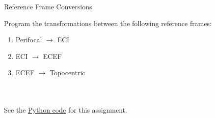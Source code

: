 


%
%

\newcommand{\hmwkTitle}{HW02}
\newcommand{\hmwkSubTitle}{Reference Frames and Ground Tracks}
\newcommand{\hmwkDueDate}{October 11th. 2025}
\newcommand{\hmwkDueTime}{11:59 PM}
\newcommand{\hmwkClass}{ENAE 441 - 0101}
\newcommand{\hmwkClassTime}{09:30 AM}
\newcommand{\hmwkClassInstructor}{Dr. Martin}
\newcommand{\hmwkAuthorName}{\textbf{Vai Srivastava}}
\newcommand{\hmwkCompletionDate}{\today}



\maketitle

\pagebreak

\begin{hwkProblem}{1}{Reference Frame Conversions} \label{hwk:p01}

	Program the transformations between the following reference frames:
	\begin{enumerate}[label=(\alph*)]
		\item \label{hwk:p01a} Perifocal \( \to \) ECI
		\item \label{hwk:p01b} ECI \( \to \) ECEF
		\item \label{hwk:p01c} ECEF \( \to \) Topocentric
	\end{enumerate}

	\hwkSol{} \label{hwk:s01}

	\hwkPart{} \label{hwk:s01a}

	\inputminted{python}{./outputs/text/s01a.txt}

	\hwkPart{} \label{hwk:s01b}

	\inputminted{python}{./outputs/text/s01b.txt}

	\hwkPart{} \label{hwk:s01c}

	\inputminted{python}{./outputs/text/s01c.txt}

	\hwkCode{} \label{code:s01}

	See the \href{https://www.github.com/vaisriv/enae441-hw02/blob/main/src/hw02.py}{Python code} for this assignment.

\end{hwkProblem}

